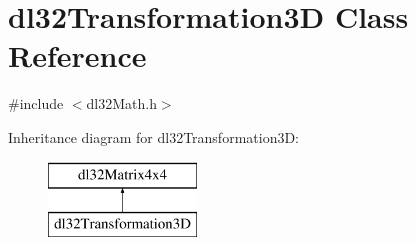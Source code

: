 \hypertarget{classdl32_transformation3_d}{\section{dl32\-Transformation3\-D Class Reference}
\label{classdl32_transformation3_d}
}


{\ttfamily \#include $<$dl32\-Math.\-h$>$}

Inheritance diagram for dl32\-Transformation3\-D\-:\begin{figure}[H]
\begin{center}
\leavevmode
\includegraphics[height=2.000000cm]{classdl32_transformation3_d}
\end{center}
\end{figure}
